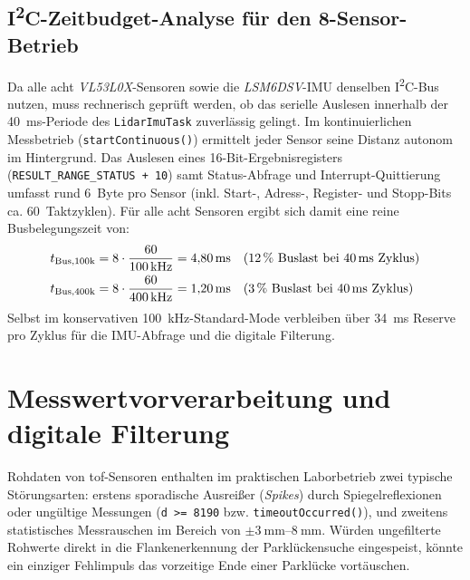 \subsection{I\textsuperscript{2}C-Zeitbudget-Analyse für den 8-Sensor-Betrieb}
\label{sec:i2c_zeitbudget}
Da alle acht \emph{VL53L0X}-Sensoren sowie die \emph{LSM6DSV}-IMU denselben I\textsuperscript{2}C-Bus nutzen, muss rechnerisch geprüft werden, ob das serielle Auslesen innerhalb der \qty{40}{\milli\second}-Periode des \texttt{LidarImuTask} zuverlässig gelingt. Im kontinuierlichen Messbetrieb (\texttt{startContinuous()}) ermittelt jeder Sensor seine Distanz autonom im Hintergrund. Das Auslesen eines 16-Bit-Ergebnisregisters (\texttt{RESULT\_RANGE\_STATUS + 10}) samt Status-Abfrage und Interrupt-Quittierung umfasst rund 6~Byte pro Sensor (inkl. Start-, Adress-, Register- und Stopp-Bits ca. 60~Taktzyklen). Für alle acht Sensoren ergibt sich damit eine reine Busbelegungszeit von:
\begin{align}
  t_{\mathrm{Bus,100k}} &= 8 \cdot \frac{60}{\qty{100}{\kilo\hertz}} = \qty{4,80}{\milli\second} \quad (\text{12\,\% Buslast bei }\qty{40}{\milli\second}\text{ Zyklus}) \label{eq:i2c_t100} \\
  t_{\mathrm{Bus,400k}} &= 8 \cdot \frac{60}{\qty{400}{\kilo\hertz}} = \qty{1,20}{\milli\second} \quad (\text{3\,\% Buslast bei }\qty{40}{\milli\second}\text{ Zyklus}) \label{eq:i2c_t400}
\end{align}
Selbst im konservativen \qty{100}{\kilo\hertz}-Standard-Mode verbleiben über \qty{34}{\milli\second} Reserve pro Zyklus für die IMU-Abfrage und die digitale Filterung.

\section{Messwertvorverarbeitung und digitale Filterung}
\label{sec:filterung}
Rohdaten von \gls{tof}-Sensoren enthalten im praktischen Laborbetrieb zwei typische Störungsarten: erstens sporadische Ausreißer (\emph{Spikes}) durch Spiegelreflexionen oder ungültige Messungen (\texttt{d >= 8190} bzw. \texttt{timeoutOccurred()}), und zweitens statistisches Messrauschen im Bereich von $\pm \qtyrange{3}{8}{\milli\meter}$. Würden ungefilterte Rohwerte direkt in die Flankenerkennung der Parklückensuche eingespeist, könnte ein einziger Fehlimpuls das vorzeitige Ende einer Parklücke vortäuschen.

